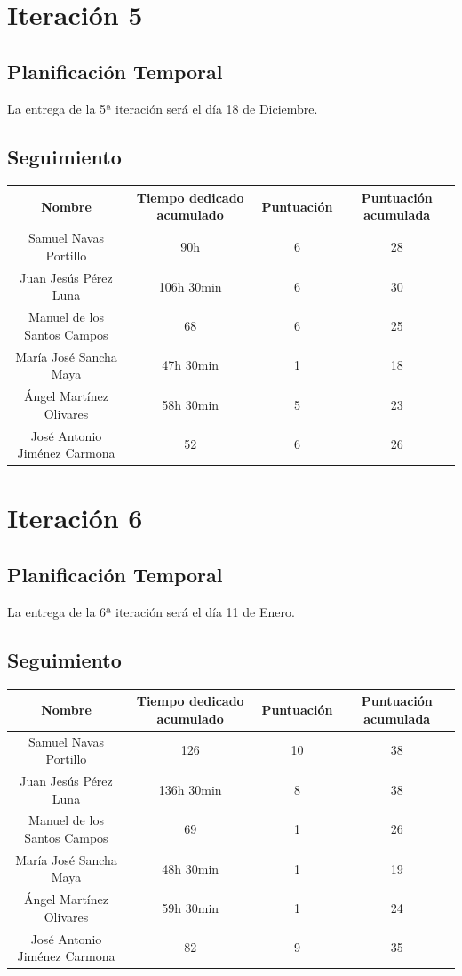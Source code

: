 \documentclass[11 pt]{book}
\begin{document}
\chapter{Iteración 5}
	\section{Planificación Temporal}
		La entrega de la 5ª iteración será el día 18 de Diciembre.
	
	\section{Seguimiento}
		\begin{tabular}{|c|c|c|c|}
			\hline
			Nombre & Tiempo dedicado acumulado & Puntuación & Puntuación acumulada\\
			\hline
			Samuel Navas Portillo & 90h & 6 & 28\\
			Juan Jesús Pérez Luna & 106h 30min & 6 & 30\\
			Manuel de los Santos Campos & 68 & 6 & 25\\
			María José Sancha Maya & 47h 30min & 1 & 18\\
			Ángel Martínez Olivares & 58h 30min & 5 & 23\\
			José Antonio Jiménez Carmona & 52 & 6 & 26\\
			\hline
		\end{tabular}
	
\chapter{Iteración 6}
	\section{Planificación Temporal}
		La entrega de la 6ª iteración será el día 11 de Enero.

	\section{Seguimiento}
		\begin{tabular}{|c|c|c|c|}
			\hline
			Nombre & Tiempo dedicado acumulado & Puntuación & Puntuación acumulada\\
			\hline
			Samuel Navas Portillo & 126 & 10 & 38\\
			Juan Jesús Pérez Luna & 136h 30min & 8 & 38\\
			Manuel de los Santos Campos & 69 & 1 & 26\\
			María José Sancha Maya & 48h 30min & 1 & 19\\
			Ángel Martínez Olivares & 59h 30min & 1 & 24\\
			José Antonio Jiménez Carmona & 82 & 9 & 35\\
			\hline
		\end{tabular}
\end{document}
